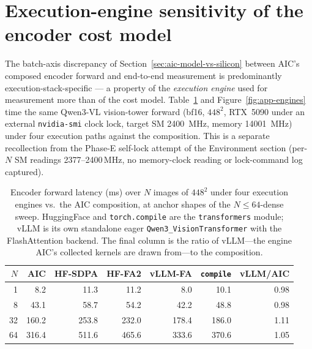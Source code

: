 \clearpage
\section[Encoder cost model: engine sensitivity]{Execution-engine sensitivity of the encoder cost model}
\label{app:engine-sensitivity}

The batch-axis discrepancy of Section~\ref{sec:aic-model-vs-silicon} between
AIC's composed encoder forward and end-to-end measurement is predominantly
execution-stack-specific --- a property of the \emph{execution engine} used
for measurement more than of the cost model. Table~\ref{tab:app-engine} and
Figure~\ref{fig:app-engines} time the same Qwen3-VL vision-tower forward
(bf16, $448^2$, RTX~5090 under an external \texttt{nvidia-smi} clock lock,
target SM \SI{2400}{\mega\hertz}, memory \SI{14001}{\mega\hertz}) under four
execution paths against the composition. This is a separate recollection from
the Phase-E self-lock attempt of the Environment section (per-$N$ SM readings
2377--2400\,\si{\mega\hertz}, no memory-clock reading or lock-command log
captured).

\begin{table}[htbp]
\centering
\caption[Encoder forward latency under four execution engines]{Encoder
forward latency (ms) over $N$ images of $448^2$ under four execution engines
vs.\ the AIC composition, at anchor shapes of the $N{\le}64$-dense sweep.
HuggingFace and \texttt{torch.compile} are the \texttt{transformers} module;
vLLM is its own standalone eager \texttt{Qwen3\_VisionTransformer} with the
FlashAttention backend. The final column is the ratio of vLLM---the engine
AIC's collected kernels are drawn from---to the composition.}
\label{tab:app-engine}
\small
\begin{tabular}{rrrrrrr}
\toprule
$N$ & AIC & HF-SDPA & HF-FA2 & vLLM-FA & \texttt{compile} & vLLM/AIC \\
\midrule
1  & 8.2   & 11.3  & 11.2  & 8.0   & 10.1  & 0.98 \\
8  & 43.1  & 58.7  & 54.2  & 42.2  & 48.8  & 0.98 \\
32 & 160.2 & 253.8 & 232.0 & 178.4 & 186.0 & 1.11 \\
64 & 316.4 & 511.6 & 465.6 & 333.6 & 370.6 & 1.05 \\
\bottomrule
\end{tabular}
\end{table}

